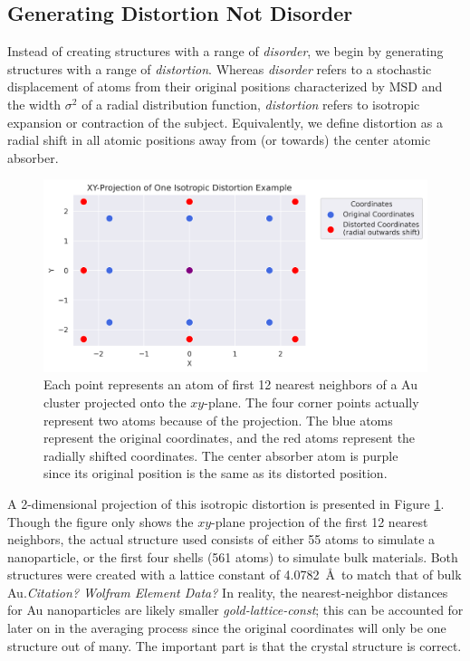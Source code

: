 \subsection{Generating Distortion Not Disorder} \label{sec:start-disorder}
Instead of creating structures with a range of \textit{disorder}, we begin by generating structures with a range of \textit{distortion}. Whereas \textit{disorder} refers to a stochastic displacement of atoms from their original positions characterized by MSD and the width $ \sigma^2 $ of a radial distribution function, \textit{distortion} refers to isotropic expansion or contraction of the subject. Equivalently, we define distortion as a radial shift in all atomic positions away from (or towards) the center atomic absorber.

\begin{figure}[h]
	\centering
	\includegraphics[width=\linewidth]{Chapters/Figures/2d_distortion_example.png}
	\caption[2D Distortion]{Each point represents an atom of first 12 nearest neighbors of a Au cluster projected onto the $xy$\nobreakdash-plane. The four corner points actually represent two atoms because of the projection. The blue atoms represent the original coordinates, and the red atoms represent the radially shifted coordinates. The center absorber atom is purple since its original position is the same as its distorted position.}
	\label{fig:2d-distortion}
\end{figure}

A 2-dimensional projection of this isotropic distortion is presented in Figure \ref{fig:2d-distortion}. Though the figure only shows the $xy$\nobreakdash-plane projection of the first 12 nearest neighbors, the actual structure used consists of either 55 atoms to simulate a nanoparticle, or the first four shells (561 atoms) to simulate bulk materials. Both structures were created with a lattice constant of 4.0782~\AA~to match that of bulk Au.\textit{Citation? Wolfram Element Data?} In reality, the nearest-neighbor distances for Au nanoparticles are likely smaller \textit{gold-lattice-const}; this can be accounted for later on in the averaging process since the original coordinates will only be one structure out of many. The important part is that the crystal structure is correct. 

